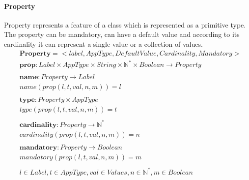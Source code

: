 \documentclass[11pt]{article}
\begin{document}
\paragraph{Property} Property represents a feature of a class which is represented as a primitive type. The property can be mandatory, can have a default value and according to its cardinality it can represent a single value or a collection of values. 
\begin{align*}
&	\mathbf{Property} = <label, AppType, DefaultValue, Cardinality, Mandatory> \\
&	\mathbf{prop} : Label \times AppType \times String \times \mathbb{N^{*}} \times Boolean \rightarrow Property \\ \\
&	\mathbf{name} : Property \rightarrow Label \\
&	name(prop(l, t, val, n, m)) = l \\ \\
&	\mathbf{type} : Property \times AppType \\
&	type(prop(l, t, val, n, m)) = t \\ \\
&	\mathbf{cardinality} : Property \rightarrow \mathbb{N^{*}} \\
&	cardinality(prop(l, t, val, n, m)) = n \\ \\
&	\mathbf{mandatory} : Property \rightarrow Boolean \\
&	mandatory(prop(l, t, val, n, m)) = m  \\ \\
&	l \in Label, t \in AppType, val \in Values, n \in \mathbb{N^{*}}, m \in Boolean 
\end{align*}
\end{document}
